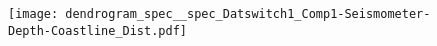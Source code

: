 \documentclass[varwidth, border=2pt]{standalone}
\begin{document}
\begin{figure}[htbp] 
   \texttt{[image: dendrogram\_spec\_\_spec\_Datswitch1\_Comp1-Seismometer-Depth-Coastline\_Dist.pdf]} 
\end{figure}
\end{document}
